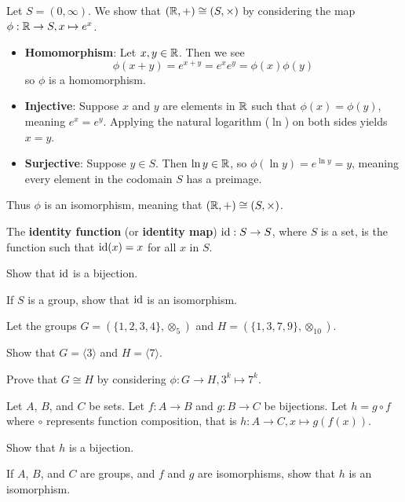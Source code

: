 \begin{example}
    Let $S = (0,\infty)$. We show that $(\mathbb{R}, +) \cong (S, \times)$ by considering the map $\phi: \mathbb{R} \to S, x \mapsto e^x$.
    \begin{itemize}
        \item \textbf{Homomorphism}: Let $x, y \in \mathbb{R}$. Then we see
        \[
            \phi(x+y) = e^{x+y} = e^xe^y = \phi(x)\phi(y)
        \]
        so $\phi$ is a homomorphism.

        \item \textbf{Injective}: Suppose $x$ and $y$ are elements in $\mathbb{R}$ such that $\phi(x) = \phi(y)$, meaning $e^x = e^y$. Applying the natural logarithm ($\ln$) on both sides yields $x = y$.

        \item \textbf{Surjective}: Suppose $y \in S$. Then $\ln y \in \mathbb{R}$, so $\phi(\ln y) = e^{\ln y} = y$, meaning every element in the codomain $S$ has a preimage.
    \end{itemize}

    Thus $\phi$ is an isomorphism, meaning that $(\mathbb{R}, +) \cong (S, \times)$.
\end{example}

\begin{exercise}\label{exercise-identity-map-is-isomorphism}
    The \textbf{identity function} (or \textbf{identity map}) $\mathrm{id}: S \to S$, where $S$ is a set, is the function such that $\mathrm{id}(x) = x$ for all $x$ in $S$.
    \begin{partquestions}{\roman*}
        \item Show that $\mathrm{id}$ is a bijection.
        \item If $S$ is a group, show that $\mathrm{id}$ is an isomorphism.
    \end{partquestions}
\end{exercise}
\begin{exercise}
    Let the groups $G = (\{1, 2, 3, 4\}, \otimes_5)$ and $H = (\{1, 3, 7, 9\}, \otimes_{10})$.
    \begin{partquestions}{\roman*}
        \item Show that $G = \langle 3 \rangle$ and $H = \langle 7 \rangle$.
        \item Prove that $G \cong H$ by considering $\phi: G \to H, 3^k \mapsto 7^k$.
    \end{partquestions}
\end{exercise}
\begin{exercise}\label{exercise-composition-of-isomorphisms-is-isomorphisms}
    Let $A$, $B$, and $C$ be sets. Let $f: A \to B$ and $g: B \to C$ be bijections. Let $h = g\circ f$ where $\circ$ represents function composition, that is $h: A \to C, x \mapsto g(f(x))$.
    \begin{partquestions}{\roman*}
        \item Show that $h$ is a bijection.
        \item If $A$, $B$, and $C$ are groups, and $f$ and $g$ are isomorphisms, show that $h$ is an isomorphism.
    \end{partquestions}
\end{exercise}

